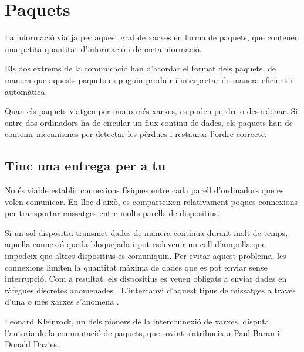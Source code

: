 
\chapter{Paquets}\label{sec:packets}

La informació viatja per aquest graf de xarxes en forma de paquets, que contenen una petita quantitat 
d'informació i de metainformació. 

Els dos extrems de la comunicació han d'acordar el format dels paquets, de manera que aquests paquets es puguin produir 
i interpretar de manera eficient i automàtica.

Quan els paquets viatgen per una o més xarxes, es poden perdre o desordenar. Si entre dos ordinadors ha de circular 
un flux continu de dades, els paquets han de contenir mecanismes per detectar les pèrdues i restaurar l'ordre correcte.

\section{Tinc una entrega per a tu}\label{sec:packets:lan_wan}

No és viable establir connexions físiques entre cada parell d'ordinadors que es volen comunicar.
En lloc d'això, es comparteixen relativament poques connexions per transportar missatges entre molts parells de dispositius.

Si un sol dispositiu transmet dades de manera contínua durant molt de temps, aquella connexió queda bloquejada i pot esdevenir un coll d'ampolla que 
impedeix que altres dispositius es comuniquin. Per evitar aquest problema, les connexions limiten la quantitat màxima de dades
que es pot enviar sense interrupció. Com a resultat, els dispositius es veuen obligats a enviar dades en ràfegues discretes anomenades 
. L'intercanvi d'aquest tipus de missatges a través d'una o més xarxes s'anomena
.

\begin{remark}
%  
% 

Leonard Kleinrock, un dels pioners de la interconnexió de xarxes, disputa l'autoria de la commutació de paquets,
que sovint s'atribueix a Paul Baran i Donald Davies.
\end{remark}

